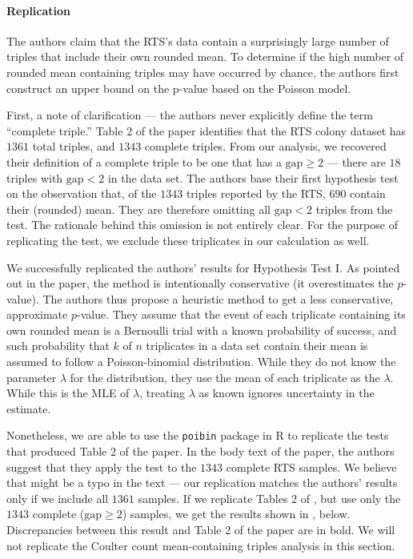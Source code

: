 \documentclass[11pt]{article}
\begin{document}
\paragraph{Replication}
The authors claim that the RTS's data contain a surprisingly large number of triples that include their own rounded mean. To determine if the high number of rounded mean containing triples may have occurred by chance, the authors first construct an upper bound on the p-value based on the Poisson model.

First, a note of clarification --- the authors never explicitly define the term ``complete triple.'' Table 2 of the paper identifies that the RTS colony dataset has $1361$ total triples, and $1343$ complete triples. From our analysis, we recovered their definition of a complete triple to be one that has a $\text{gap} \ge 2$ --- there are $18$ triples with $\text{gap} < 2$ in the data set. The authors base their first hypothesis test on the observation that, of the $1343$ triples reported by the RTS, $690$ contain their (rounded) mean. They are therefore omitting all $\text{gap} < 2$ triples from the test. The rationale behind this omission is not entirely clear. For the purpose of replicating the test, we exclude these triplicates in our calculation as well. 

We successfully replicated the authors' results for Hypothesis Test I. As pointed out in the paper, the method is intentionally conservative (it overestimates the $p$-value). The authors thus propose a heuristic method to get a less conservative, approximate $p$-value. They assume that the event of each triplicate containing its own rounded mean is a Bernoulli trial with a known probability of success, and such probability that $k$ of $n$ triplicates in a data set contain their mean is assumed to follow a Poisson-binomial distribution. While they do not know the parameter $\lambda$ for the distribution, they use the mean of each triplicate as the $\lambda$. While this is the MLE of $\lambda$, treating $\lambda$ as known ignores uncertainty in the estimate.

Nonetheless, we are able to use the {\tt poibin} package in R to replicate the tests that produced Table 2 of the paper. In the body text of the paper, the authors suggest that they apply the test to the $1343$ complete RTS samples. We believe that might be a typo in the text --- our replication matches the authors' results only if we include all $1361$ samples.  If we replicate Tables 2 of \citet{Pitt:2016cu}, but use only the $1343$ complete ($\text{gap} \ge 2$) samples, we get the results shown in , below. Discrepancies between this result and Table 2 of the paper are in bold. We will not replicate the Coulter count mean-containing triples analysis in this section.
\end{document}
